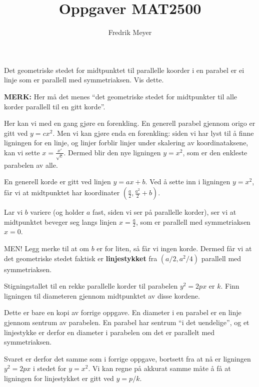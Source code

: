 \documentclass[11pt, norsk]{article}
\begin{document}
\title{Oppgaver MAT2500}
\author{Fredrik Meyer}
\maketitle 

\begin{oppg}
  Det geometriske stedet for midtpunktet til parallelle koorder i en parabel er ei linje som er parallell med symmetriaksen. Vis dette.

\textbf{MERK:} Her må det menes ``det geometriske stedet for midtpunkter til alle korder parallell til en gitt korde''.
\end{oppg}
\begin{losn}

Her kan vi med en gang gjøre en forenkling. En generell parabel gjennom origo er gitt ved $y=cx^2$. Men vi kan gjøre enda en forenkling: siden vi har lyst til å finne ligningen for en linje, og linjer forblir linjer under skalering av koordinataksene, kan vi sette $x = \frac{x'}{\sqrt{c}}$. Dermed blir den nye ligningen $y=x^2$, som er den enkleste parabelen av alle.

En generell korde er gitt ved linjen $y=ax+b$. Ved å sette inn i ligningen $y=x^2$, får vi at midtpunktet har koordinater $(\frac a2,\frac{a^2}{2} +b)$.

Lar vi $b$ variere (og holder $a$ fast, siden vi ser på parallelle korder), ser vi at midtpunktet beveger seg langs linjen $x=\frac a2$, som er parallell med symmetriaksen $x=0$.

MEN! Legg merke til at om $b$ er for liten, så får vi ingen korde. Dermed får vi at det geometriske stedet faktisk er \textbf{linjestykket} fra $(a/2,a^2/4)$ parallell med symmetriaksen.
\end{losn}

\begin{oppg}
Stigningstallet til en rekke parallelle korder til parabelen $y^2=2px$ er $k$. Finn ligningen til diameteren gjennom midtpunktet av disse kordene.
\end{oppg}

\begin{losn}
Dette er bare en kopi av forrige oppgave. En diameter i en parabel er en linje gjennom sentrum av parabelen. En parabel har sentrum ``i det uendelige'', og et linjestykke er derfor en diameter i parabelen om det er parallelt med symmetriaksen. 

Svaret er derfor det samme som i forrige oppgave, bortsett fra at nå er ligningen $y^2=2px$ i stedet for $y=x^2$. Vi kan regne på akkurat samme måte å få at ligningen for linjestykket er gitt ved $y = p/k$.
\end{losn}
\end{document}
